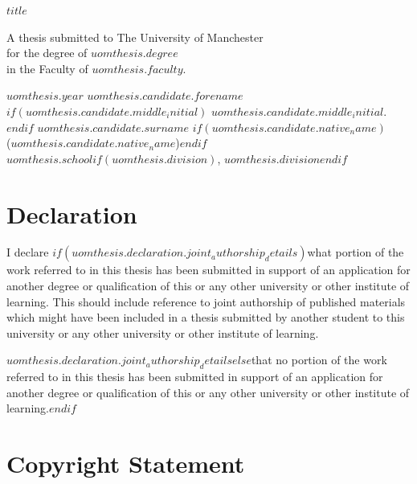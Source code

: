 \documentclass[$if(fontsize)$$fontsize$,$endif$a4paper]{report}
\begin{document}
\begin{titlepage}
\centering
\vspace*{6cm}
{\Large\bfseries $title$\par}
\vspace{3cm}
A thesis submitted to The University of Manchester\\
for the degree of $uomthesis.degree$\\
in the Faculty of $uomthesis.faculty$.
\vspace{3cm}

$uomthesis.year$
\vfill
$uomthesis.candidate.forename$$if(uomthesis.candidate.middle_initial)$ $uomthesis.candidate.middle_initial$.$endif$ $uomthesis.candidate.surname$
$if(uomthesis.candidate.native_name)$\\($uomthesis.candidate.native_name$)$endif$\\[1ex]
$uomthesis.school$$if(uomthesis.division)$, $uomthesis.division$$endif$
\end{titlepage}

\chapter*{Declaration}

I declare $if(uomthesis.declaration.joint_authorship_details)$what portion of the work referred to in this thesis has been submitted in support of an application for another degree or qualification of this or any other university or other institute of learning. This should include reference to joint authorship of published materials which might have been included in a thesis submitted by another student to this university or any other university or other institute of learning.

$uomthesis.declaration.joint_authorship_details$$else$that no portion of the work referred to in this thesis has been submitted in support of an application for another degree or qualification of this or any other university or other institute of learning.$endif$

\chapter*{Copyright Statement}
\end{document}
